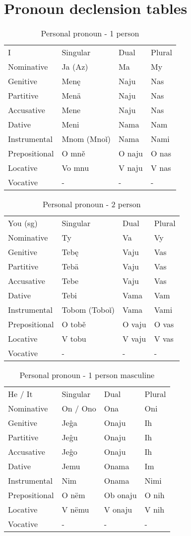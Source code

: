\section{Pronoun declension tables}

\begin{table}[!htb]
	\caption{Personal pronoun - 1 person}
	\begin{tabular}{llll}
		I & Singular & Dual & Plural \\
		Nominative & Ja (Az) & Ma & My \\
		Genitive & Menę & Naju & Nas \\
		Partitive & Menä & Naju & Nas \\
		Accusative & Mene & Naju & Nas \\
		Dative & Meni & Nama & Nam \\
		Instrumental & Mnom (Mnoǐ) & Nama & Nami \\
		Prepositional & O mně & O naju & O nas \\
		Locative & Vo mnu & V naju & V nas \\
		Vocative & - & - & -
	\end{tabular}
\end{table}

\begin{table}[!htb]
	\caption{Personal pronoun - 2 person}
	\begin{tabular}{llll}
		You (sg) & Singular & Dual & Plural \\
		Nominative & Ty & Va & Vy \\
		Genitive & Tebę & Vaju & Vas \\
		Partitive & Tebä & Vaju & Vas \\
		Accusative & Tebe & Vaju & Vas \\
		Dative & Tebi & Vama & Vam \\
		Instrumental & Tobom (Toboǐ) & Vama & Vami \\
		Prepositional & O tobě & O vaju & O vas \\
		Locative & V tobu & V vaju & V vas \\
		Vocative & - & - & -
	\end{tabular}
\end{table}

\begin{table}[!htb]
	\caption{Personal pronoun - 1 person masculine}
	\begin{tabular}{llll}
		He / It & Singular & Dual & Plural \\
		Nominative & On / Ono & Ona & Oni \\
		Genitive & Jeĝa & Onaju & Ih \\
		Partitive & Jeĝu & Onaju & Ih \\
		Accusative & Jeĝo & Onaju & Ih \\
		Dative & Jemu & Onama & Im \\
		Instrumental & Nim & Onama & Nimi \\
		Prepositional & O nëm & Ob onaju & O nih \\
		Locative & V nëmu & V onaju & V nih \\
		Vocative & - & - & -
	\end{tabular}
\end{table}

